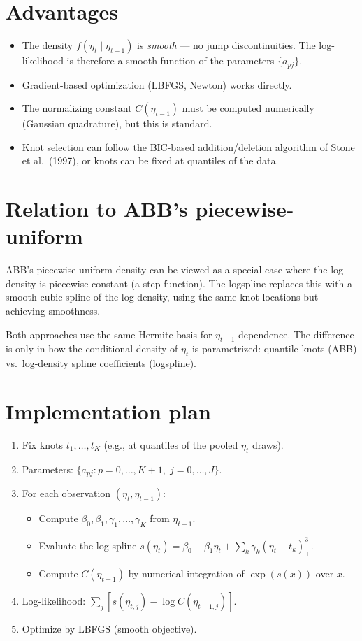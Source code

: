 \documentclass[12pt]{article}
\begin{document}
\section{Advantages}

\begin{itemize}
\item The density $f(\eta_t \mid \eta_{t-1})$ is \emph{smooth} ---
no jump discontinuities.  The log-likelihood is therefore a smooth
function of the parameters $\{a_{pj}\}$.
\item Gradient-based optimization (LBFGS, Newton) works directly.
\item The normalizing constant $C(\eta_{t-1})$ must be computed
numerically (Gaussian quadrature), but this is standard.
\item Knot selection can follow the BIC-based addition/deletion
algorithm of Stone et al.\ (1997), or knots can be fixed at
quantiles of the data.
\end{itemize}

\section{Relation to ABB's piecewise-uniform}

ABB's piecewise-uniform density can be viewed as a special case
where the log-density is piecewise constant (a step function).
The logspline replaces this with a smooth cubic spline of the
log-density, using the same knot locations but achieving smoothness.

\medskip\noindent
Both approaches use the same Hermite basis for
$\eta_{t-1}$-dependence.  The difference is only in how the
conditional density of $\eta_t$ is parametrized: quantile knots
(ABB) vs.\ log-density spline coefficients (logspline).

\section{Implementation plan}

\begin{enumerate}
\item Fix knots $t_1,\ldots,t_K$ (e.g., at quantiles of the pooled $\eta_t$ draws).
\item Parameters: $\{a_{pj} : p = 0,\ldots,K+1,\; j = 0,\ldots,J\}$.
\item For each observation $(\eta_t, \eta_{t-1})$:
  \begin{itemize}
  \item Compute $\beta_0, \beta_1, \gamma_1,\ldots,\gamma_K$ from $\eta_{t-1}$.
  \item Evaluate the log-spline $s(\eta_t) = \beta_0 + \beta_1 \eta_t + \sum_k \gamma_k (\eta_t - t_k)_+^3$.
  \item Compute $C(\eta_{t-1})$ by numerical integration of $\exp(s(x))$ over $x$.
  \end{itemize}
\item Log-likelihood: $\sum_j [s(\eta_{t,j}) - \log C(\eta_{t-1,j})]$.
\item Optimize by LBFGS (smooth objective).
\end{enumerate}
\end{document}
